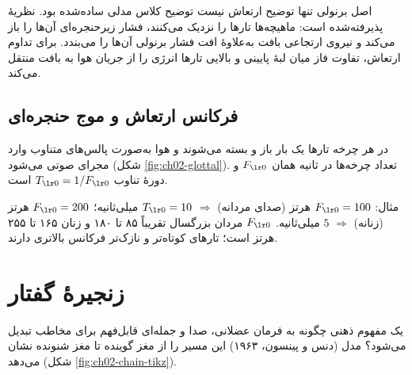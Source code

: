 \begin{correctionbox}{اصل برنولی تنها توضیح ارتعاش نیست}
توضیح کلاس مدلی ساده‌شده بود. نظریهٔ پذیرفته‌شده  است: ماهیچه‌ها تارها را نزدیک می‌کنند، فشار زیرحنجره‌ای آن‌ها را باز می‌کند و نیروی ارتجاعی بافت به‌علاوهٔ افت فشار برنولی آن‌ها را می‌بندد. برای تداوم ارتعاش، تفاوت فاز میان لبهٔ پایینی و بالایی تارها انرژی را از جریان هوا به بافت منتقل می‌کند.
\end{correctionbox}

\subsection{فرکانس ارتعاش و موج حنجره‌ای}
در هر چرخه تارها یک بار باز و بسته می‌شوند و هوا به‌صورت پالس‌های متناوب وارد مجرای صوتی می‌شود (شکل \ref{fig:ch02-glottal}). تعداد چرخه‌ها در ثانیه همان $\chtwoFz $ و دورهٔ تناوب $\chtwoTz  = 1/\chtwoFz $ است.

\label{fig:ch02-glottal}

مثال: $\chtwoFz  = 100$ هرتز (صدای مردانه) $\Rightarrow$ $\chtwoTz  = 10$ میلی‌ثانیه؛ $\chtwoFz  = 200$ هرتز (زنانه) $\Rightarrow$ $5$ میلی‌ثانیه. $\chtwoFz $ مردان بزرگسال تقریباً ۸۵ تا ۱۸۰ و زنان ۱۶۵ تا ۲۵۵ هرتز است؛ تارهای کوتاه‌تر و نازک‌تر فرکانس بالاتری دارند.

\section{زنجیرهٔ گفتار}

یک مفهوم ذهنی چگونه به فرمان عضلانی، صدا و جمله‌ای قابل‌فهم برای مخاطب تبدیل می‌شود؟ مدل  (دنس و پینسون، ۱۹۶۳) این مسیر را از مغز گوینده تا مغز شنونده نشان می‌دهد (شکل \ref{fig:ch02-chain-tikz}).

